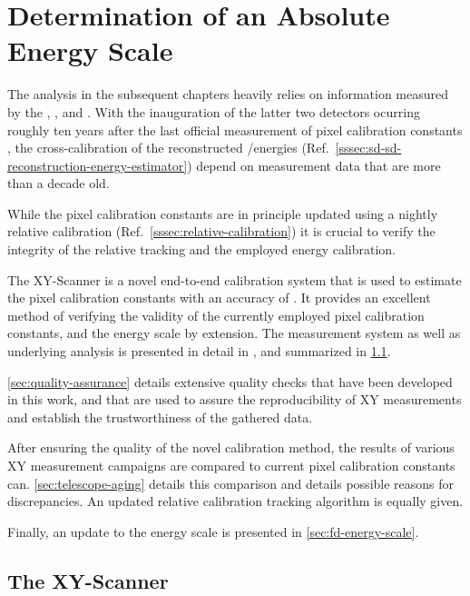 
\chapter{Determination of an Absolute Energy Scale}
\label{chap:xy-scanner}

The analysis in the subsequent chapters heavily relies on information measured 
by the \WCD, \SSD, and \UMD. With the inauguration of the latter two detectors 
ocurring roughly ten years after the last official measurement of \FD pixel 
calibration constants \cite{dorofeevFDAbsoluteCalibration2013}, the 
cross-calibration of the reconstructed \UMD/\SSD energies (Ref.\ 
\cref{sssec:sd-sd-reconstruction-energy-estimator}) depend on measurement data 
that are more than a decade old. 

While the pixel calibration constants are in principle updated using a nightly 
relative calibration (Ref.~\cref{sssec:relative-calibration}) it is crucial to 
verify the integrity of the relative tracking and the employed energy 
calibration.

The XY-Scanner is a novel end-to-end calibration system that is used to 
estimate the \FD pixel calibration constants with an accuracy of 
\todo{uncertainty}. It provides an excellent method of verifying the validity 
of the currently employed pixel calibration constants, and the \FD energy scale
by extension. The measurement system as well as underlying analysis is 
presented in detail in \cite{schaferXYScannerVersatileMethod2023}, and 
summarized in \cref{sec:xy-scanner}.

\cref{sec:quality-assurance} details extensive quality checks that have been
developed in this work, and that are used to assure the reproducibility of XY 
measurements and establish the trustworthiness of the gathered data.

After ensuring the quality of the novel calibration method, the results of 
various XY measurement campaigns are compared to current pixel calibration 
constants can. \cref{sec:telescope-aging} details this comparison and details
possible reasons for discrepancies. An updated relative calibration tracking 
algorithm is equally given.

Finally, an update to the \FD energy scale is presented in 
\cref{sec:fd-energy-scale}.

\section{The XY-Scanner}
\label{sec:xy-scanner}

